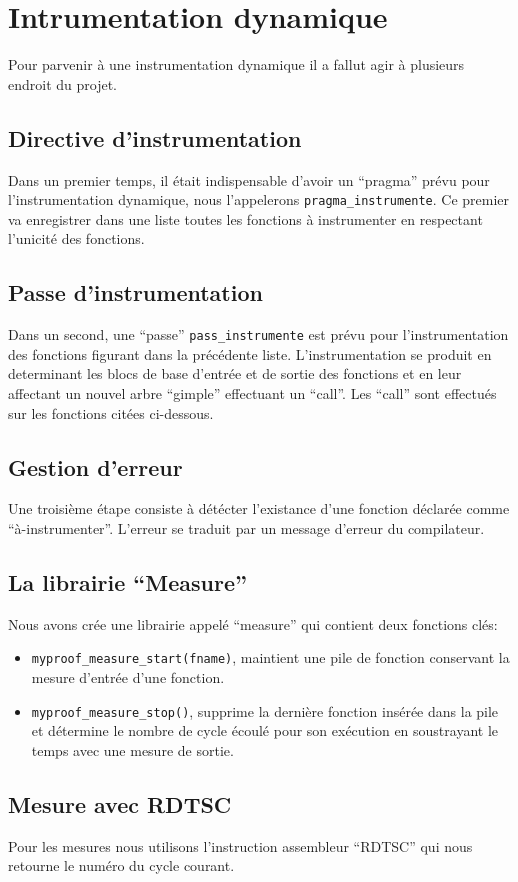 \section{Intrumentation dynamique}

Pour parvenir à une instrumentation dynamique il a fallut agir à plusieurs endroit du projet.

\subsection{Directive d'instrumentation}

Dans un premier temps, il était indispensable d'avoir un ``pragma'' prévu pour l'instrumentation dynamique, nous l'appelerons \verb#pragma_instrumente#. Ce premier va enregistrer dans une liste toutes les fonctions à instrumenter en respectant l'unicité des fonctions.

\subsection{Passe d'instrumentation}

Dans un second, une ``passe'' \verb#pass_instrumente# est prévu pour l'instrumentation des fonctions figurant dans la précédente liste. L'instrumentation se produit en determinant les blocs de base d'entrée et de sortie des fonctions et en leur affectant un nouvel arbre ``gimple'' effectuant un ``call''. Les ``call'' sont effectués sur les fonctions citées ci-dessous.

\subsection{Gestion d'erreur}

Une troisième étape consiste à détécter l'existance d'une fonction déclarée comme ``à-instrumenter''. L'erreur se traduit par un message d'erreur du compilateur.

\subsection{La librairie ``Measure''}

Nous avons crée une librairie appelé ``measure'' qui contient deux fonctions clés:\\

\begin{itemize}

\item \verb#myproof_measure_start(fname)#, maintient une pile de fonction conservant la mesure d'entrée d'une fonction.\\

\item \verb#myproof_measure_stop()#, supprime la dernière fonction insérée dans la pile et détermine le nombre de cycle écoulé pour son exécution en soustrayant le temps avec une mesure de sortie.

\end{itemize}

\subsection{Mesure avec RDTSC}

Pour les mesures nous utilisons l'instruction assembleur ``RDTSC'' qui nous retourne le numéro du cycle courant.
